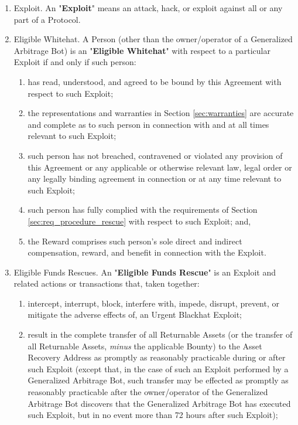 \documentclass{article}
\begin{document}
\begin{enumerate}[label=\Alph*.]
    \item Exploit. An "\textbf{Exploit}" means an attack, hack, or exploit against all or any part of a Protocol.

    \item Eligible Whitehat. A Person (other than the owner/operator of a Generalized Arbitrage Bot) is an "\textbf{Eligible Whitehat}" with respect to a particular Exploit if and only if such person:

          \begin{enumerate}
              \item has read, understood, and agreed to be bound by this Agreement with respect to such Exploit;

              \item the representations and warranties in Section \ref{sec:warranties} are accurate and complete as to such person in connection with and at all times relevant to such Exploit;

              \item such person has not breached, contravened or violated any provision of this Agreement or any applicable or otherwise relevant law, legal order or any legally binding agreement in connection or at any time relevant to such Exploit;

              \item such person has fully complied with the requirements of Section \ref{sec:req_procedure_rescue} with respect to such Exploit; and,

              \item the Reward comprises such person's sole direct and indirect compensation, reward, and benefit in connection with the Exploit.

          \end{enumerate}

    \item Eligible Funds Rescues. An "\textbf{Eligible Funds Rescue}" is an Exploit and related actions or transactions that, taken together:

          \begin{enumerate}
              \item intercept, interrupt, block, interfere with, impede, disrupt, prevent, or mitigate the adverse effects of, an Urgent Blackhat Exploit;

              \item result in the complete transfer of all Returnable Assets (or the transfer of all Returnable Assets, \textit{minus} the applicable Bounty) to the Asset Recovery Address as promptly as reasonably practicable during or after such Exploit (except that, in the case of such an Exploit performed by a Generalized Arbitrage Bot, such transfer may be effected as promptly as reasonably practicable after the owner/operator of the Generalized Arbitrage Bot discovers that the Generalized Arbitrage Bot has executed such Exploit, but in no event more than 72 hours after such Exploit);


\end{enumerate}
\end{enumerate}
\end{document}
